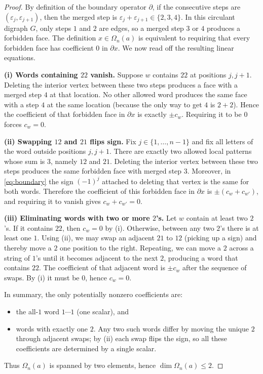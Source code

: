 \documentclass[11pt]{amsart}
\theoremstyle{plain}
\theoremstyle{definition}
\numberwithin{equation}{section}
\begin{document}
\begin{proof}
By definition of the boundary operator $\partial$, 
if the consecutive steps are $(\varepsilon_j,\varepsilon_{j+1})$, then the merged step is
$\varepsilon_j+\varepsilon_{j+1}\in\{2,3,4\}$.
In this circulant digraph $G$, only steps $1$ and $2$ are edges, so a merged step $3$ or $4$ produces a forbidden face.
The definition $x\in\Omega_n(a)$ is equivalent to requiring that every forbidden face has coefficient $0$ in $\partial x$.
We now read off the resulting linear equations.

\smallskip
\noindent\textbf{(i) Words containing $22$ vanish.}
Suppose $w$ contains $22$ at positions $j,j+1$.
Deleting the interior vertex between these two steps produces a face with a merged step $4$ at that location.
No other allowed word produces the same face with a step $4$ at the same location (because the only way to get $4$ is $2+2$).
Hence the coefficient of that forbidden face in $\partial x$ is exactly $\pm c_w$.
Requiring it to be $0$ forces $c_w=0$.

\smallskip
\noindent\textbf{(ii) Swapping $12$ and $21$ flips sign.}
Fix $j\in\{1,\dots,n-1\}$ and fix all letters of the word outside positions $j,j+1$.
There are exactly two allowed local patterns whose sum is $3$, namely $12$ and $21$.
Deleting the interior vertex between these two steps produces the same forbidden face with merged step $3$.
Moreover, in \eqref{eq:boundary} the sign $(-1)^j$ attached to deleting that vertex is the same for both words.
Therefore the coefficient of this forbidden face in $\partial x$ is $\pm(c_w+c_{w'})$, and requiring it to vanish gives
$c_w+c_{w'}=0$.

\smallskip
\noindent\textbf{(iii) Eliminating words with two or more $2$'s.}
Let $w$ contain at least two $2$'s.
If it contains $22$, then $c_w=0$ by (i).
Otherwise, between any two $2$'s there is at least one $1$.
Using (ii), we may swap an adjacent $21$ to $12$ (picking up a sign) and thereby move a $2$ one position to the right.
Repeating, we can move a $2$ across a string of $1$'s until it becomes adjacent to the next $2$, producing a word that contains $22$.
The coefficient of that adjacent word is $\pm c_w$ after the sequence of swaps.
By (i) it must be $0$, hence $c_w=0$.

\smallskip

In summary, the only potentially nonzero coefficients are:
\begin{itemize}
    \item[(a)] the all-$1$ word $1\cdots 1$ (one scalar), and
    \item[(b)] words with exactly one $2$. Any two such words differ by moving the unique $2$ through adjacent swaps; by (ii) each swap flips the sign, so all these coefficients
are determined by a single scalar.
\end{itemize}
Thus $\Omega_n(a)$ is spanned by two elements, hence $\dim\Omega_n(a)\le 2$.
\end{proof}
\end{document}
